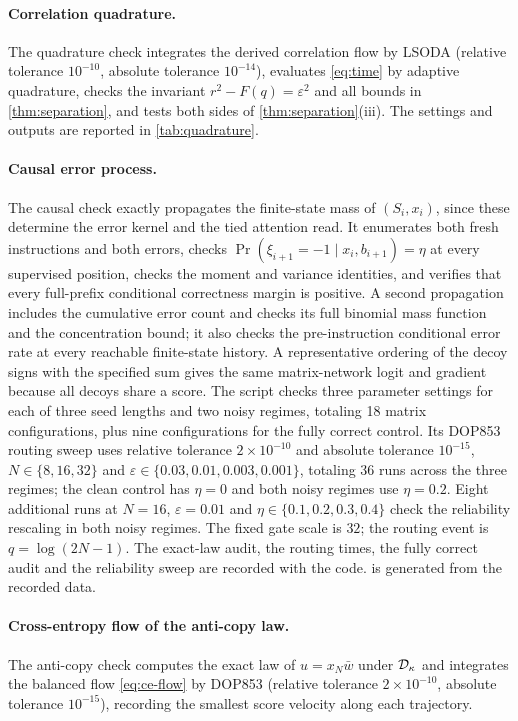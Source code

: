 \paragraph{Correlation quadrature.}
The quadrature check integrates the derived correlation flow by LSODA
(relative tolerance $10^{-10}$, absolute tolerance $10^{-14}$), evaluates \cref{eq:time} by adaptive quadrature,
checks the invariant $r^2-F(q)=\varepsilon^2$ and all bounds in \cref{thm:separation}, and tests both sides of \cref{thm:separation}(iii).
The settings and outputs are reported in \cref{tab:quadrature}.

\paragraph{Causal error process.}
The causal check exactly propagates the finite-state mass of $(S_i,x_i)$, since these determine the error kernel and the tied attention read.
It enumerates both fresh instructions and both errors, checks $\Pr(\xi_{i+1}=-1\mid x_i,b_{i+1})=\eta$ at every supervised position,
checks the moment and variance identities, and verifies that every full-prefix conditional correctness margin is positive.
A second propagation includes the cumulative error count and checks its full binomial mass function and the concentration bound;
it also checks the pre-instruction conditional error rate at every reachable finite-state history.
A representative ordering of the decoy signs with the specified sum gives the same matrix-network logit and gradient because all decoys share a score.
The script checks three parameter settings for each of three seed lengths and two noisy regimes, totaling 18 matrix configurations,
plus nine configurations for the fully correct control.
Its DOP853 routing sweep uses relative tolerance $2\times10^{-10}$ and absolute tolerance $10^{-15}$,
$N\in\{8,16,32\}$ and $\varepsilon\in\{0.03,0.01,0.003,0.001\}$, totaling 36 runs across the three regimes;
the clean control has $\eta=0$ and both noisy regimes use $\eta=0.2$.
Eight additional runs at $N=16$, $\varepsilon=0.01$ and $\eta\in\{0.1,0.2,0.3,0.4\}$ check the reliability rescaling in both noisy regimes.
The fixed gate scale is $32$; the routing event is $q=\log(2N-1)$.
The exact-law audit, the routing times, the fully correct audit and the reliability sweep are recorded with the code.
 is generated from the recorded data.

\paragraph{Cross-entropy flow of the anti-copy law.}
The anti-copy check computes the exact law of $u=x_N\bar w$ under $\mathcal D_{\kappa}$ and integrates the balanced flow \cref{eq:ce-flow}
by DOP853 (relative tolerance $2\times10^{-10}$, absolute tolerance $10^{-15}$), recording the smallest score velocity along each trajectory.

